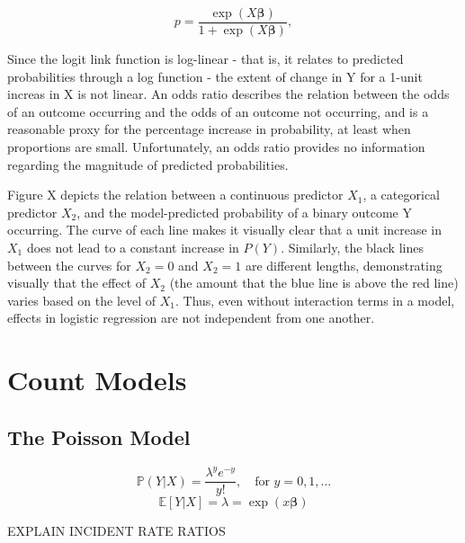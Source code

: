 \documentclass[jou, apacite]{apa6}
\begin{document}
\begin{equation} \label{log1}
p = \dfrac{\exp (X \bm{\beta})}{1 + \exp (X \bm{\beta})},
\end{equation}


Since the logit link function is log-linear - that is, it relates to predicted probabilities through a log function - the extent of change in Y for a 1-unit increas in X is not linear. 
An odds ratio describes the relation between the odds of an outcome occurring and the odds of an outcome not occurring, and is a reasonable proxy for the percentage increase in probability, at least when proportions are small.
Unfortunately, an odds ratio provides no information regarding the magnitude of predicted probabilities.

Figure X depicts the relation between a continuous predictor $X_1$, a categorical predictor $X_2$, and the model-predicted probability of a binary outcome Y occurring. 
The curve of each line makes it visually clear that a unit increase in $X_1$ does not lead to a constant increase in $P(Y)$.
Similarly, the black lines between the curves for $X_2=0$ and $X_2=1$ are different lengths, demonstrating visually that the effect of $X_2$ (the amount that the blue line is above the red line) varies based on the level of $X_1$.
Thus, even without interaction terms in a model, effects in logistic regression are not independent from one another. 

\section{Count Models}

\subsection{The Poisson Model}

\begin{equation} \label{pois1}
\mathbb{P}(Y|X) = \dfrac{\lambda^{y}e^{-y}}{y!}, \quad\text{for } y = 0, 1, \dots
\end{equation}
\begin{equation} \label{pois2}
\mathbb{E}[Y|X] = \lambda = \exp (x \bm{\beta})
\end{equation}

EXPLAIN INCIDENT RATE RATIOS
\end{document}
